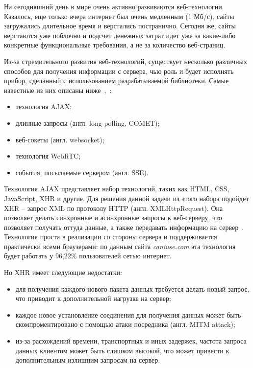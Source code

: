 На сегодняшний день в мире очень активно развиваются веб-техноло\-гии. Казалось,
еще только вчера интернет был очень медленным (1 Мб/с), сайты загружались
длительное время и верстались постранично. Сегодня же, сайты верстаются уже
поблочно и подсчет денежных затрат идет уже за какие-либо конкретные функциональные
требования, а не за количество веб-страниц.

Из-за стремительного развития веб-технологий, существует несколько различных
способов для получения информации с сервера, чью роль и будет исполнять прибор,
сделанный с использованием разрабатываемой библиотеки. Самые известные из них описаны
ниже~\cite{web_client_server_communication_select_site},~\cite{professional_js_book}:
\begin{itemize}
    \item технология AJAX;
    \item длинные запросы (англ. long polling, COMET);
    \item веб-сокеты (англ. websocket);
    \item технология WebRTC;
    \item события, посылаемые сервером (англ. SSE).
\end{itemize}


Технология AJAX представляет набор технологий, таких как HTML, CSS, JavaScript, XHR
и другие. Для решения данной задачи из этого набора подойдет XHR -- запрос XML
по протоколу HTTP (англ. XMLHttpRequest). Она позволяет делать синхронные и
асинхронные запросы к веб-серверу, что позволяет получать оттуда данные,
а также передавать информацию на сервер~\cite{ajax_mdn_site}.
Технология проста в реализации со стороны сервера и поддерживается
практически всеми браузерами: по данным сайта
\textit{caniuse.com} эта технология будет работать у 96,22\% пользователей
сетью интернет.

Но XHR имеет следующие недостатки:
\begin{itemize}
    \item для получения каждого нового пакета данных требуется делать новый запрос,
        что приводит к дополнительной нагрузке на сервер;
    \item каждое новое установление соединения для получения данных может быть
        скомпроментировано с помощью атаки посредника (англ. MITM attack);
    \item из-за расхождений времени, транспортных и иных задержек, частота
        запроса данных клиентом может быть слишком высокой,
        что может привести к дополнительным излишним запросам на сервер.
\end{itemize}

